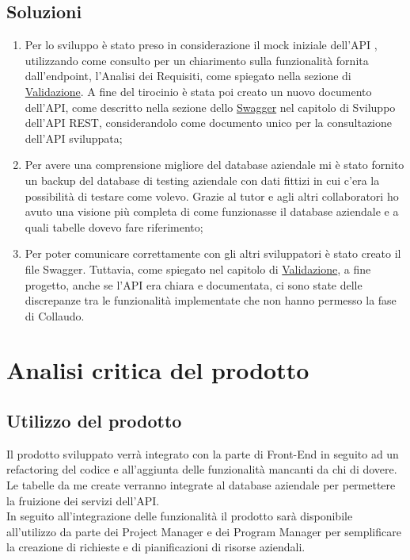 \subsection*{Soluzioni}
\begin{enumerate}
\item Per lo sviluppo è stato preso in considerazione il mock iniziale dell’API , utilizzando come consulto per un chiarimento sulla funzionalità fornita dall’endpoint, l’Analisi dei Requisiti, come spiegato nella sezione di \hyperlink{validation}{Validazione}. A fine del tirocinio è stata poi creato un nuovo documento dell'API, come descritto nella sezione dello \hyperlink{swagger}{Swagger} nel capitolo di Sviluppo dell’API REST, considerandolo come documento unico per la consultazione dell’API sviluppata;
\item Per avere una comprensione migliore del database aziendale mi è stato fornito un backup del database di testing aziendale con dati fittizi in cui c’era la possibilità di testare come volevo. Grazie al tutor e agli altri collaboratori ho avuto una visione più completa di come funzionasse il database aziendale e a quali tabelle dovevo fare riferimento;
\item Per poter comunicare correttamente con gli altri sviluppatori è stato creato il file Swagger. Tuttavia, come spiegato nel capitolo di \hyperlink{validation}{Validazione}, a fine progetto, anche se l’API era chiara e documentata, ci sono state delle discrepanze tra le funzionalità implementate che non hanno permesso la fase di Collaudo.
\end{enumerate}

\section{Analisi critica del prodotto}
\subsection{Utilizzo del prodotto}
Il prodotto sviluppato verrà integrato con la parte di Front-End in seguito ad un refactoring del codice e all'aggiunta delle funzionalità mancanti da chi di dovere. Le tabelle da me create verranno integrate al database aziendale per permettere la fruizione dei servizi dell'API.\\ In seguito all'integrazione delle funzionalità il prodotto sarà disponibile all'utilizzo da parte dei Project Manager e dei Program Manager per semplificare la creazione di richieste e di pianificazioni di risorse aziendali.

